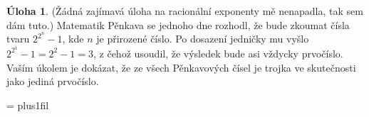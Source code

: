 \documentclass[10pt,a5paper]{extarticle}
\let\results\newpage
\let\endresults\relax
\theoremstyle{definition}
\newtheorem{uloha}{\atr Úloha}
\def\vysld{}
\let\printvysl\relax
\def\atr{}
\def\interest{\def\atr{\llap{$\star$ }\gdef\atr{}}}
\begin{document}
\interest
\begin{uloha}
(Žádná zajímavá úloha na racionální exponenty mě nenapadla, tak sem dám tuto.)
Matematik Pěnkava se jednoho dne rozhodl, že bude zkoumat čísla tvaru $2^{2^n} - 1$, kde $n$ je přirozené číslo. Po dosazení jedničky mu vyšlo $2^{2^1} - 1 = 2^2 - 1 = 3$, z čehož usoudil, že výsledek bude asi vždycky prvočíslo. Vaším úkolem je dokázat, že ze všech Pěnkavových čísel je trojka ve skutečnosti jako jediná prvočíslo.
\end{uloha}


\baselineskip
{}


\results
\parindent=0pt
\parskip=\smallskipamount
\rightskip=0pt plus1fil\relax
\def\printvysl#1#2{\textbf{#1.} #2\par}
\vysld
\endresults



\end{document}
